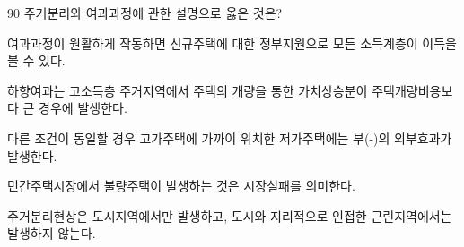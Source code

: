\begin{question}{90}
주거분리와 여과과정에 관한 설명으로 옳은 것은?
\begin{choices}
  \item 여과과정이 원활하게 작동하면 신규주택에 대한 정부지원으로 모든 소득계층이 이득을 볼 수 있다.
  \item 하향여과는 고소득층 주거지역에서 주택의 개량을 통한 가치상승분이 주택개량비용보다 큰 경우에 발생한다.
  \item 다른 조건이 동일할 경우 고가주택에 가까이 위치한 저가주택에는 부(-)의 외부효과가 발생한다.
  \item 민간주택시장에서 불량주택이 발생하는 것은 시장실패를 의미한다.
  \item 주거분리현상은 도시지역에서만 발생하고, 도시와 지리적으로 인접한 근린지역에서는 발생하지 않는다.
\end{choices}
\end{question}
